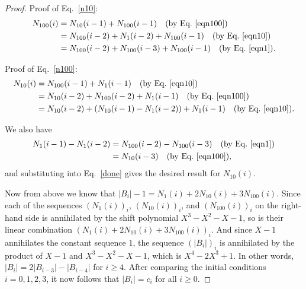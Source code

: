 \documentclass[10pt,a4paper]{amsart}
\begin{document}
\begin{proof}
Proof of Eq.~\eqref{n10}:
\begin{align*}
N_{100} (i) &= N_{10} (i-1) + N_{100} (i-1) \quad \text{(by Eq.~\eqref{eqn100})} \\
&= N_{100} (i-2) + N_1 (i-2) + N_{100} (i-1) \quad \text{(by Eq.~\eqref{eqn10})} \\
&= N_{100} (i-2) + N_{100} (i-3) + N_{100} (i-1) \quad \text{(by Eq.~\eqref{eqn1})}.
\end{align*}

Proof of Eq.~\eqref{n100}:
\begin{align}
N_{10} (i) &= N_{100} (i-1) + N_1 (i-1) \quad \text{(by Eq.~\eqref{eqn10})}  \nonumber\\
&= N_{10} (i-2) + N_{100} (i-2) + N_1(i-1) \quad \text{(by Eq.~\eqref{eqn100})} \nonumber \\
&= N_{10} (i-2) + (N_{10} (i-1) - N_1 (i-2)) + N_1 (i-1) \quad \text{(by Eq.~\eqref{eqn10})} \label{done} .
\end{align}

We also have
\begin{align*}
N_1(i-1) - N_1 (i-2) &= N_{100} (i-2) - N_{100} (i-3) \quad \text{(by Eq.~\eqref{eqn1})} \\
&= N_{10} (i-3) \quad \text{(by Eq.~\eqref{eqn100})},
\end{align*}
and substituting into Eq.~\eqref{done} gives the desired result for $N_{10} (i)$.

Now from above we know that $|B_i| - 1 = N_1 (i) + 2 N_{10} (i) + 3 N_{100} (i)$.  Since each of the
sequences $(N_1 (i))_i$, $(N_{10} (i))_i$, and $(N_{100} (i))_i$ 
on the right-hand side is annihilated by the shift polynomial $X^3 - X^2 - X - 1$, so is their linear
combination  $(N_1 (i) + 2 N_{10} (i) + 3 N_{100} (i))_i$.  And since $X-1$ annihilates the
constant sequence $1$, the sequence $(|B_i|)_i$ is annihilated by the product of
$X-1$ and $X^3 - X^2 - X - 1$, which is $X^4 - 2X^3 + 1$.   In other words,
$|B_{i}| = 2|B_{i-3}| - |B_{i-4}|$ for $i \geq 4$.  After comparing the initial conditions
$i = 0,1,2,3$, it now follows that
$|B_i| = c_i$ for all $i \geq 0$.
\end{proof}
\end{document}
